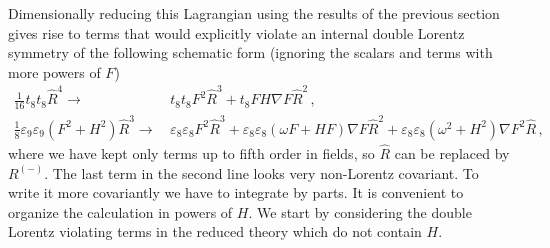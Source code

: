 \documentclass[a4paper,11pt]{article}
\begin{document}
Dimensionally reducing this Lagrangian using the results of the previous section gives rise to terms that would explicitly violate an internal double Lorentz symmetry of the following schematic form (ignoring the scalars and terms with more powers of $F$)
\begin{align}
\frac{1}{16}t_8t_8\hat R^4\rightarrow&\,t_8t_8F^2\hat R^3+t_8FH\nabla F\hat R^2\,,
\\
\frac18\varepsilon_9\varepsilon_9(F^2+H^2)\hat R^3\rightarrow&\,
\varepsilon_8\varepsilon_8F^2\hat R^3
+\varepsilon_8\varepsilon_8(\omega F+HF)\nabla F\hat R^2
+\varepsilon_8\varepsilon_8(\omega^2+H^2)\nabla F^2\hat R\,,
\end{align}
where we have kept only terms up to fifth order in fields, so $\hat R$ can be replaced by $R^{(-)}$. The last term in the second line looks very non-Lorentz covariant. To write it more covariantly we have to integrate by parts. It is convenient to organize the calculation in powers of $H$. We start by considering the double Lorentz violating terms in the reduced theory which do not contain $H$.
\end{document}
